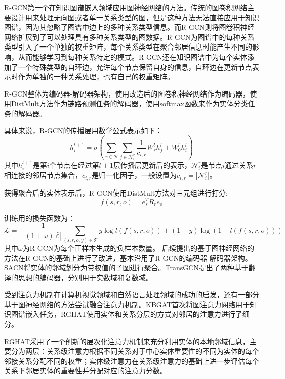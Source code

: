 R-GCN第一个在知识图谱嵌入领域应用图神经网络的方法。传统的图卷积网络主要设计用来处理无向图或者单一关系类型的图，但是这种方法无法直接应用于知识图谱，因为其忽略了图谱中边上的多种关系类型信息。而R-GCN则将图卷积神经网络扩展到了可以处理具有多种关系类型的图数据。R-GCN为图谱中的每种关系类型引入了一个单独的权重矩阵，每个关系类型在聚合邻居信息时能产生不同的影响，从而能够学习到每种关系特定的模式。R-GCN还在知识图谱中为每个实体添加了一个特殊类型的自环边，允许每个节点保留自身的信息，自环边在更新节点表示时作为单独的一种关系处理，也有自己的权重矩阵。

R-GCN整体为编码器-解码器架构，使用改造后的图卷积神经网络作为编码器，使用DistMult方法作为链路预测任务的解码器，使用softmax函数来作为实体分类任务的解码器。

具体来说，R-GCN的传播层用数学公式表示如下：
\begin{equation}
  h_i^{l+1}=\sigma \left(\sum_{r\in\mathcal{R}}\sum_{j\in\mathcal{N}_i^r}\frac{1}{c_{i,r}}W_r^lh_j^l+W_0^lh_i^l  \right) 
\end{equation}
其中$h_i^{l+1}$是第$i$个节点在经过第$l+1$层传播层更新后的表示，$\mathcal{N}_i^r$是节点$i$通过关系$r$相连接的邻居节点集合，$c_{i,r}$是归一化因子，一般设置为$c_{i,r}=\left\lvert\mathcal{N}_i^r\right\rvert$。

获得聚合后的实体表示后，R-GCN使用DistMult方法对三元组进行打分:
\begin{equation}
  f(s,r,o)=e_s^TR_re_o
\end{equation}

训练用的损失函数为：
\begin{equation}
  \mathcal{L} =-\frac{1}{(1+\omega )\left\lvert\hat{\varepsilon } \right\rvert } \sum_{(s,r,o,y)\in \mathcal{T} }y\log l(f(s,r,o))+(1-y)\log(1-l(f(s,r,o)))
\end{equation}
其中$\omega$为R-GCN为每个正样本生成的负样本数量。
后续提出的基于图神经网络的方法在R-GCN的基础上进行了改进，基本沿用了R-GCN的编码器-解码器架构。SACN将实体的邻域划分为带权值的子图进行聚合。TransGCN提出了两种基于翻译的思想的编码器，分别用于实数域和复数域。

受到注意力机制在计算机视觉领域和自然语言处理领域的成功的启发，还有一部分基于图神经网络的方法尝试融合注意力机制。KBGAT首次将图注意力网络用于知识图谱嵌入任务，RGHAT使用实体和关系分层的方式对邻居的注意力进行了细分。

RGHAT采用了一个创新的层次化注意力机制来充分利用实体的本地邻域信息，主要分为两层：关系级注意力根据不同关系对于中心实体重要性的不同为实体的每个邻接关系分配不同的权重；实体级注意力在关系级注意力的基础上进一步评估每个关系下邻居实体的重要性并分配对应的注意力分数。

